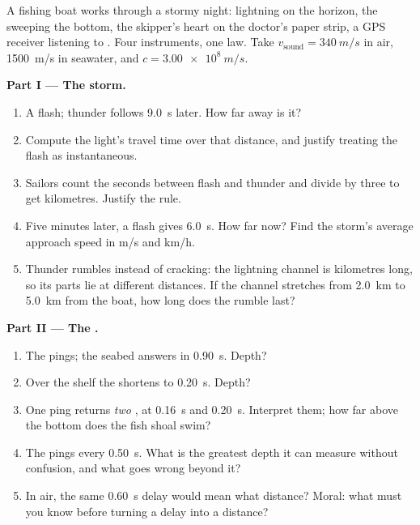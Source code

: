 \begin{problem}[{Weekend problem --- reading the world's signals: one
law, $d = v\,t$, ranges a storm, maps a seabed, counts a heartbeat and
teases out how GPS works}]
\label{pb:g10:signals-and-waves:1}
A fishing boat works through a stormy night: lightning on the horizon,
the  sweeping the bottom, the skipper's heart on the doctor's paper
strip, a GPS receiver listening to . Four instruments, one
law. Take $v_{\text{sound}} = \qty{340}{m/s}$ in air, \qty{1500}{m/s} in
seawater, and $c = \qty{3.00e8}{m/s}$.

\medskip
\noindent\textbf{Part I --- The storm.}
\begin{enumerate}
  \item A flash; thunder follows \qty{9.0}{s} later. How far away is it?
  \item Compute the light's travel time over that distance, and justify
        treating the flash as instantaneous.
  \item Sailors count the seconds between flash and thunder and divide
        by three to get kilometres. Justify the rule.
  \item Five minutes later, a flash gives \qty{6.0}{s}. How far now?
        Find the storm's average approach speed in \unit{m/s} and \unit{km/h}.
  \item Thunder rumbles instead of cracking: the lightning channel is
        kilometres long, so its parts lie at different distances. If the
        channel stretches from \qty{2.0}{km} to \qty{5.0}{km} from the
        boat, how long does the rumble last?
\end{enumerate}

\medskip
\noindent\textbf{Part II --- The .}
\begin{enumerate}[resume]
  \item The  pings; the seabed answers in \qty{0.90}{s}. Depth?
  \item Over the shelf the  shortens to \qty{0.20}{s}. Depth?
  \item One ping returns \emph{two} , at \qty{0.16}{s} and
        \qty{0.20}{s}. Interpret them; how far above the bottom does the
        fish shoal swim?
  \item The  pings every \qty{0.50}{s}. What is the greatest depth
        it can measure without confusion, and what goes wrong beyond it?
  \item In air, the same \qty{0.60}{s} delay would mean what distance?
        Moral: what must you know before turning a delay into a
        distance?
\end{enumerate}


\end{problem}
